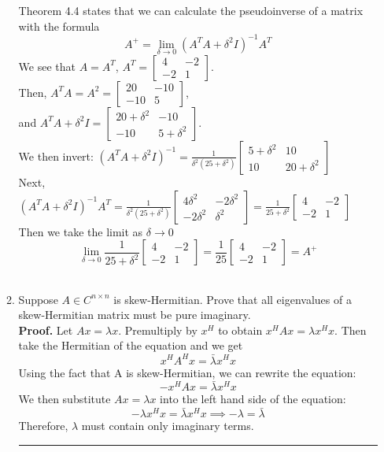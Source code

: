 \documentclass[12pt]{article}
\numberwithin{equation}{section}
\newenvironment{proof}[1][Proof]{\textbf{#1.} }{\ \rule{0.5em}{0.5em}}
\begin{document}
\begin{enumerate}
\begin{enumerate}
        Theorem 4.4 states that we can calculate the pseudoinverse of a matrix with the formula
        $$A^+=\lim_{\delta\to 0}(A^TA+\delta^2I)^{-1}A^T$$
        We see that $A=A^T$, $A^T=\left[\begin{array} {cc} 4&-2\\-2&1\end{array}\right]$.\\
        Then, $A^TA=A^2=\left[\begin{array}{cc}20&-10\\-10&5\end{array}\right]$,\\
        and $A^TA+\delta^2I=\left[\begin{array}{cc}20+\delta^2&-10\\-10&5+\delta^2\end{array}\right]$.\\ We then invert: $(A^TA+\delta^2I)^{-1}=\frac{1}{\delta^2(25+\delta^2)}\left[\begin{array}{cc}5+\delta^2&10\\10&20+\delta^2\end{array}\right]$\\
        Next, $(A^TA+\delta^2I)^{-1}A^T=\frac{1}{\delta^2(25+\delta^2)}\left[\begin{array}{cc}4\delta^2&-2\delta^2\\-2\delta^2&\delta^2\end{array}\right]=\frac{1}{25+\delta^2}\left[\begin{array}{cc}4&-2\\-2&1\end{array}\right]$
        Then we take the limit as $\delta\to 0$
        $$\lim_{\delta\to 0}\frac{1}{25+\delta^2}\left[\begin{array}{cc}4&-2\\-2&1\end{array}\right]=\frac{1}{25}\left[\begin{array}{cc}4&-2\\-2&1\end{array}\right]=A^+$$\\

        \item Suppose $A\in C^{n\times n}$ is skew-Hermitian. Prove that all eigenvalues of a skew-Hermitian matrix must be pure imaginary.\\
            \begin{proof} Let $Ax=\lambda x$. Premultiply by $x^H$ to obtain $x^HAx=\lambda x^Hx$. Then take the Hermitian of the equation and we get
            $$x^HA^Hx=\bar{\lambda}x^Hx$$
            Using the fact that A is skew-Hermitian, we can rewrite the equation:
            $$-x^HAx=\bar{\lambda}x^Hx$$
            We then substitute $Ax=\lambda x$ into the left hand side of the equation:
            $$-\lambda x^Hx=\bar{\lambda}x^Hx\implies -\lambda=\bar{\lambda}$$
            Therefore, $\lambda$ must contain only imaginary terms.
            \end{proof}


\end{enumerate}
\end{enumerate}
\end{document}
